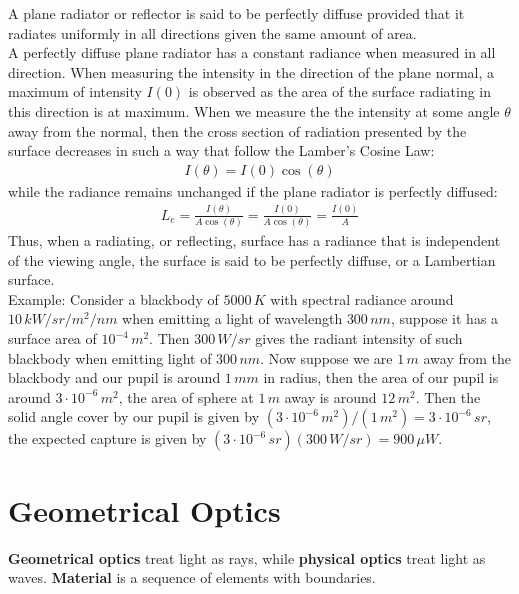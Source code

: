 \documentclass[11pt]{book}
\theoremstyle{break}
\theoremstyle{break}
\newcommand{\ee}[1]{\cdot 10^{#1}}
\newcommand{\example}{\color{green}Example: \color{black}}
\begin{document}
A plane radiator or reflector is said to be perfectly diffuse provided that it radiates uniformly in all directions given the same amount of area.\\

A perfectly diffuse plane radiator has a constant radiance when measured in all direction. When measuring the intensity in the direction of the plane normal, a maximum of intensity $I(0)$ is observed as the area of the surface radiating in this direction is at maximum. When we measure the the intensity at some angle $\theta$ away from the normal, then the cross section of radiation presented by the surface decreases in such a way that follow the Lamber's Cosine Law:
\begin{align}
I(\theta) = I(0)\cos(\theta)
\end{align}
while the radiance remains unchanged if the plane radiator is perfectly diffused:
\begin{align}
L_e = \frac{I(\theta)}{A\cos(\theta)} = \frac{I(0)}{A\cos(\theta)} = \frac{I(0)}{A}
\end{align}
Thus, when a radiating, or reflecting, surface has a radiance that is independent of the viewing angle, the surface is said to be perfectly diffuse, or a Lambertian surface. \\

\example
Consider a blackbody of $5000\,K$ with spectral radiance around $10\, kW/sr/m^2/nm$ when emitting a light of wavelength $300\, nm$, suppose it has a surface area of $10^{-4}\, m^2$. Then $300\, W/sr$ gives the radiant intensity of such blackbody when emitting light of $300\, nm$. Now suppose we are $1\, m$ away from the blackbody and our pupil is around $1\,mm$ in radius, then the area of our pupil is around $3\ee{-6}\, m^2$, the area of sphere at $1\, m$ away is around $12\, m^2$. Then the solid angle cover by our pupil is given by $(3\ee{-6}\, m^2)/(1\, m^2) = 3\ee{-6}\, sr$, the expected capture is given by $(3\ee{-6}\, sr)(300\, W/sr) = 900\, \mu W$.\\


\newpage
\chapter{Geometrical Optics}
\textbf{Geometrical optics} treat light as rays, while \textbf{physical optics} treat light as waves. \textbf{Material} is a sequence of elements with boundaries. \\
\end{document}
